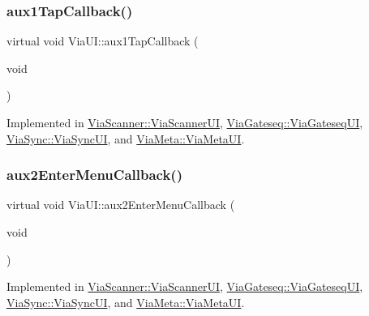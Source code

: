 \mbox{\label{class_via_u_i_a2942ec6f7d495159258e1f1803e62c4d}} 
\subsubsection{\texorpdfstring{aux1\+Tap\+Callback()}{aux1TapCallback()}}
{\footnotesize\ttfamily virtual void Via\+U\+I\+::aux1\+Tap\+Callback (\begin{DoxyParamCaption}\item[{void}]{ }\end{DoxyParamCaption})\hspace{0.3cm}{\ttfamily [pure virtual]}}



Implemented in \mbox{\hyperlink{class_via_scanner_1_1_via_scanner_u_i_af7e91846bdd9922b309580adf4fe653b}{Via\+Scanner\+::\+Via\+Scanner\+UI}}, \mbox{\hyperlink{class_via_gateseq_1_1_via_gateseq_u_i_a3f44c4a89f3f7aedff958e903e6c71b5}{Via\+Gateseq\+::\+Via\+Gateseq\+UI}}, \mbox{\hyperlink{class_via_sync_1_1_via_sync_u_i_a53f8add06247c8ed4e7a1c049e8136fb}{Via\+Sync\+::\+Via\+Sync\+UI}}, and \mbox{\hyperlink{class_via_meta_1_1_via_meta_u_i_ad95b464f8dda873be1c24622d1f082fa}{Via\+Meta\+::\+Via\+Meta\+UI}}.

\mbox{\label{class_via_u_i_a1f51fc259471364f91bd0a1592824dab}} 
\subsubsection{\texorpdfstring{aux2\+Enter\+Menu\+Callback()}{aux2EnterMenuCallback()}}
{\footnotesize\ttfamily virtual void Via\+U\+I\+::aux2\+Enter\+Menu\+Callback (\begin{DoxyParamCaption}\item[{void}]{ }\end{DoxyParamCaption})\hspace{0.3cm}{\ttfamily [pure virtual]}}



Implemented in \mbox{\hyperlink{class_via_scanner_1_1_via_scanner_u_i_a5173aaf7222a059fa7d3a4b32f6fb275}{Via\+Scanner\+::\+Via\+Scanner\+UI}}, \mbox{\hyperlink{class_via_gateseq_1_1_via_gateseq_u_i_a3f3270689385b4ba7449599538aafc59}{Via\+Gateseq\+::\+Via\+Gateseq\+UI}}, \mbox{\hyperlink{class_via_sync_1_1_via_sync_u_i_a8af905460e4d9b91420fa557be0baeae}{Via\+Sync\+::\+Via\+Sync\+UI}}, and \mbox{\hyperlink{class_via_meta_1_1_via_meta_u_i_a31e89fca82851581b9ad7161cd81c6c0}{Via\+Meta\+::\+Via\+Meta\+UI}}.

